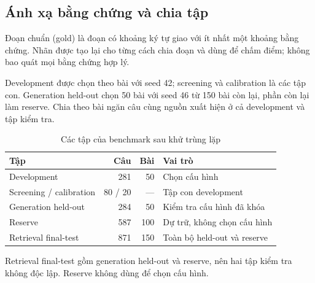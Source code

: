\subsection{Ánh xạ bằng chứng và chia tập}
Đoạn chuẩn (gold) là đoạn có khoảng ký tự giao với ít nhất một khoảng bằng chứng. Nhãn được tạo lại cho từng cách chia đoạn và dùng để chấm điểm; không bao quát mọi bằng chứng hợp lý.

Development được chọn theo bài với seed 42; screening và calibration là các tập con. Generation held-out chọn 50 bài với seed 46 từ 150 bài còn lại, phần còn lại làm reserve. Chia theo bài ngăn câu cùng nguồn xuất hiện ở cả development và tập kiểm tra.
\begin{table}[H]\centering\small
\caption{Các tập của benchmark sau khử trùng lặp}\label{tab:partitions}
\begin{tabularx}{\linewidth}{@{}YrrY@{}}\toprule
\textbf{Tập} & \textbf{Câu} & \textbf{Bài} & \textbf{Vai trò}\\\midrule
Development & 281 & 50 & Chọn cấu hình \\
Screening / calibration & 80 / 20 & --- & Tập con development \\
Generation held-out & 284 & 50 & Kiểm tra cấu hình đã khóa \\
Reserve & 587 & 100 & Dự trữ, không chọn cấu hình \\
Retrieval final-test & 871 & 150 & Toàn bộ held-out và reserve \\\bottomrule
\end{tabularx}\end{table}
Retrieval final-test gồm generation held-out và reserve, nên hai tập kiểm tra không độc lập. Reserve không dùng để chọn cấu hình.
